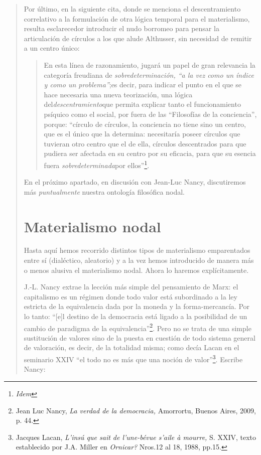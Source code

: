 \begin{quote}
Por último, en la siguiente cita, donde se menciona el descentramiento correlativo a la formulación de otra lógica temporal para el materialismo, resulta esclarecedor introducir el nudo borromeo para pensar la articulación de círculos a los que alude Althusser, sin necesidad de remitir a un centro único:

\begin{quote}
En esta línea de razonamiento, jugará un papel de gran relevancia la categoría freudiana de \emph{sobredeterminación, \enquote{a la vez como un índice y como un problema}};es decir, para indicar el punto en el que se hace necesaria una nueva teorización, una lógica del\emph{descentramiento}que permita explicar tanto el funcionamiento psíquico como el social, por fuera de las \enquote{Filosofías de la conciencia}, porque: \enquote{círculo de círculos, la conciencia no tiene sino un centro, que es el único que la determina: necesitaría poseer círculos que tuvieran otro centro que el de ella, círculos descentrados para que pudiera ser afectada en su centro por su eficacia, para que su esencia fuera \emph{sobredeterminada}por ellos}\footnote{\emph{Idem}}.
\end{quote}

En el próximo apartado, en discusión con Jean-Luc Nancy, discutiremos más \emph{puntualmente} nuestra ontología filosófica nodal.

\section{Materialismo nodal}

Hasta aquí hemos recorrido distintos tipos de materialismo emparentados entre sí (dialéctico, aleatorio) y a la vez hemos introducido de manera más o menos alusiva el materialismo nodal. Ahora lo haremos explícitamente.

J.-L. Nancy extrae  la lección más simple del pensamiento de Marx: el capitalismo es un régimen donde todo valor está subordinado a la ley estricta de la equivalencia dada por la moneda y la forma-mercancía. Por lo tanto: \enquote{{[}e{]}l destino de la democracia está ligado a la posibilidad de un cambio de paradigma de la equivalencia}\footnote{Jean Luc Nancy, \emph{La verdad de la democracia,} Amorrortu, Buenos Aires, 2009, p. 44.}. Pero no se trata de una simple sustitución de valores sino de la puesta en cuestión de todo sistema general de valoración, es decir, de la totalidad misma; como decía Lacan en el seminario XXIV \enquote{el todo no es más que una noción de valor}\footnote{Jacques Lacan, \emph{L'insú que sait de l'une-bévue s'aile à mourre,} S. XXIV, texto establecido por J.A. Miller en \emph{Ornicar?} Nros.12 al 18, 1988, pp.15.}. Escribe Nancy:


\end{quote}
